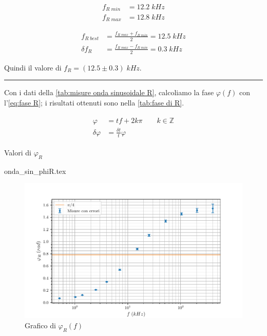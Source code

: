 \documentclass[11pt, a4paper]{article}
\numberwithin{equation}{section} %
\begin{document}
\begin{align*}
    f_{R \; min} &= 12.2 \; kHz \\
    f_{R \; max} &= 12.8 \; kHz
\end{align*}

\begin{align*}
    f_{R \; best} &= \frac{f_{R \; max} + f_{R \; min}}{2} = 12.5  \; kHz \\
    \delta f_{R} &= \frac{f_{R \; max} - f_{R \; min}}{2} = 0.3 \; kHz
\end{align*}

Quindi il valore di \(f_{R} = (12.5 \pm 0.3) \; kHz\).

\rule{\textwidth}{1pt}

Con i dati della \autoref{tab:misure onda sinusoidale R}, calcoliamo la fase $\varphi(f)$ con l'\autoref{eq:fase R}; i risultati ottenuti sono nella \autoref{tab:fase di R}.

\begin{align} \label{eq:fase R}
    \begin{split}
        \varphi &= tf + 2k\pi \qquad k \in \mathbb{Z} \\
        \delta \varphi &= \frac{\delta t}{t} \varphi
    \end{split}
\end{align}

\begin{table}[ht!]
    \centering
    \caption{Valori di $\varphi_{R}$}
    {onda_sin_phiR.tex}
    \label{tab:fase di R}
\end{table}


\begin{figure}[ht!]
    \includegraphics{onda_sin_phi(f)_R.pdf}
    \caption{Grafico di $\varphi_{R}(f)$}
    \label{fig:fase R}
\end{figure}
\end{document}
